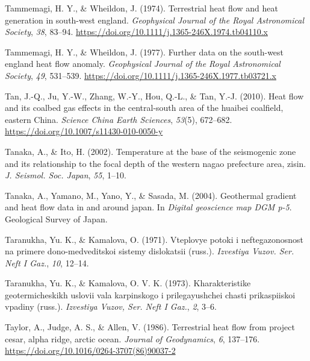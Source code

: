 \begin{CSLReferences}{1}{1}
\leavevmode{}%
Tammemagi, H. Y., \& Wheildon, J. (1974). Terrestrial heat flow and heat generation in south-west england. \emph{Geophysical Journal of the Royal Astronomical Society}, \emph{38}, 83--94. \url{https://doi.org/10.1111/j.1365-246X.1974.tb04110.x}

\leavevmode{}%
Tammemagi, H. Y., \& Wheildon, J. (1977). Further data on the south-west england heat flow anomaly. \emph{Geophysical Journal of the Royal Astronomical Society}, \emph{49}, 531--539. \url{https://doi.org/10.1111/j.1365-246X.1977.tb03721.x}

\leavevmode{}%
Tan, J.-Q., Ju, Y.-W., Zhang, W.-Y., Hou, Q.-L., \& Tan, Y.-J. (2010). Heat flow and its coalbed gas effects in the central-south area of the huaibei coalfield, eastern {China}. \emph{Science China Earth Sciences}, \emph{53}(5), 672--682. \url{https://doi.org/10.1007/s11430-010-0050-y}

\leavevmode{}%
Tanaka, A., \& Ito, H. (2002). Temperature at the base of the seismogenic zone and its relationship to the focal depth of the western nagao prefecture area, zisin. \emph{J. Seismol. Soc. Japan}, \emph{55}, 1--10.

\leavevmode{}%
Tanaka, A., Yamano, M., Yano, Y., \& Sasada, M. (2004). Geothermal gradient and heat flow data in and around japan. In \emph{Digital geoscience map DGM p-5}. Geological Survey of Japan.

\leavevmode{}%
Taranukha, Yu. K., \& Kamalova, O. (1971). Vteplovye potoki i neftegazonosnost na primere dono-medveditskoi sistemy dislokatsii (russ.). \emph{Izvestiya Vuzov. Ser. Neft I Gaz.}, \emph{10}, 12--14.

\leavevmode{}%
Taranukha, Yu. K., \& Kamalova, O. V. K. (1973). Kharakteristike geotermicheskikh uslovii vala karpinskogo i prilegayushchei chasti prikaspiiskoi vpadiny (russ.). \emph{Izvestiya Vuzov, Ser. Neft I Gaz.}, \emph{2}, 3--6.

\leavevmode{}%
Taylor, A., Judge, A. S., \& Allen, V. (1986). Terrestrial heat flow from project cesar, alpha ridge, arctic ocean. \emph{Journal of Geodynamics}, \emph{6}, 137--176. \url{https://doi.org/10.1016/0264-3707(86)90037-2}


\end{CSLReferences}
